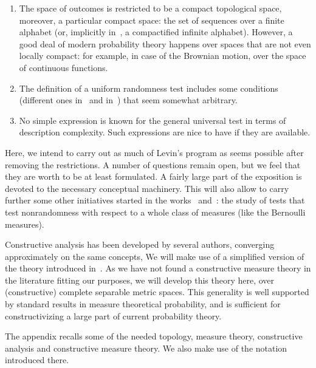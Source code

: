   \begin{enumerate}

   \item The space of outcomes is restricted to be a compact topological
space, moreover, a particular compact space: the set of 
sequences over a finite alphabet (or, implicitly in~\cite{LevinRandCons84},
a compactified infinite alphabet).
However, a good deal of modern probability theory happens over
spaces that are not even locally compact:
for example, in case of the Brownian motion, over the
space of continuous functions.

   \item The definition of a uniform randomness test includes some conditions
(different ones in~\cite{LevinUnif76} and 
in~\cite{LevinRandCons84}) that seem somewhat arbitrary.

   \item No simple expression is known for the general
universal test in terms of description complexity.
Such expressions are nice to have if they are available.

  \end{enumerate}

Here, we intend to carry out as much of Levin's program as seems
possible after removing the restrictions.
A number of questions remain open, but we feel that they are worth
to be at least formulated.
A fairly large part of the exposition
is devoted to the necessary conceptual machinery.
This will also allow to carry further some other initiatives started in the
works~\cite{MLof66art} and~\cite{LevinRand73}: the study of tests that test
nonrandomness with respect to a whole class of measures (like the Bernoulli
measures).

Constructive analysis has been developed by several authors,
converging approximately on the same concepts,
We will make use of a simplified  version of the theory introduced  
in~\cite{WeihrauchComputAnal00}.
As we have not found a constructive measure theory in the
literature fitting our purposes, we will develop this theory here,
over (constructive) complete separable metric spaces.
This generality is well supported by standard results in measure
theoretical probability, and is
sufficient for constructivizing a large part of current probability
theory.

The appendix recalls some of the needed topology, measure theory,
constructive analysis and constructive measure theory.
We also make use of the notation introduced there.


